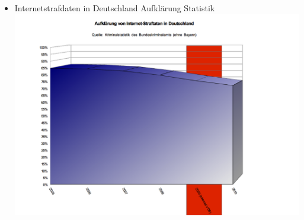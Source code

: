           \begin{frame}
\begin{itemize}
        \item Internetstrafdaten in Deutschland Aufklärung Statistik
        \includegraphics[height=1\textheight]{sections/img/aufklaerung_internetdelikte_DE.png}
    \end{itemize}
    \end{frame}
